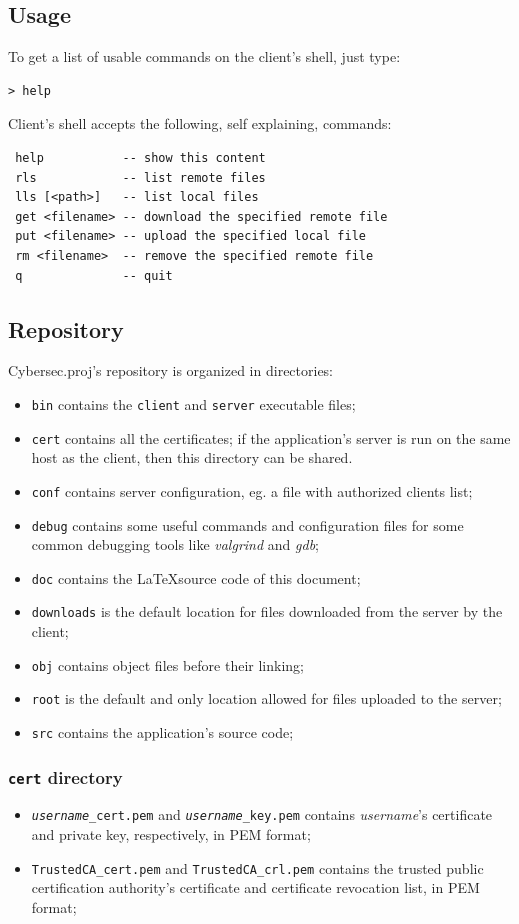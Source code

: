 \documentclass[a4paper,12pt]{article}
\newcommand{\projectname}{Cybersec.proj}
\begin{document}
\subsection{Usage}
To get a list of usable commands on the client's shell, just type:
\begin{verbatim}
> help
\end{verbatim}

Client's shell accepts the following, self explaining, commands:
\begin{verbatim}
 help           -- show this content
 rls            -- list remote files
 lls [<path>]   -- list local files
 get <filename> -- download the specified remote file
 put <filename> -- upload the specified local file
 rm <filename>  -- remove the specified remote file
 q              -- quit
\end{verbatim}

\subsection{Repository}
\projectname{}'s repository is organized in directories:
\begin{itemize}
  \item \texttt{bin} contains the \texttt{client} and \texttt{server} executable files;
  \item \texttt{cert} contains all the certificates; if the application's server is run on the same host as the client, then this directory can be shared.
  \item \texttt{conf} contains server configuration, eg. a file with authorized clients list;
  \item \texttt{debug} contains some useful commands and configuration files for some common debugging tools like \emph{valgrind} and \emph{gdb};
  \item \texttt{doc} contains the \LaTeX source code of this document;
  \item \texttt{downloads} is the default location for files downloaded from the server by the client;
  \item \texttt{obj} contains object files before their linking;
  \item \texttt{root} is the default and only location allowed for files uploaded to the server;
  \item \texttt{src} contains the application's source code;
\end{itemize}

\subsubsection{\texttt{cert} directory}
\begin{itemize}
    \item \texttt{\emph{username}\_cert.pem} and \texttt{\emph{username}\_key.pem} contains \emph{username}'s certificate and private key, respectively, in PEM format;
    \item \texttt{TrustedCA\_cert.pem} and \texttt{TrustedCA\_crl.pem} contains the trusted public certification authority's certificate and certificate revocation list, in PEM format;
\end{itemize}
\end{document}

